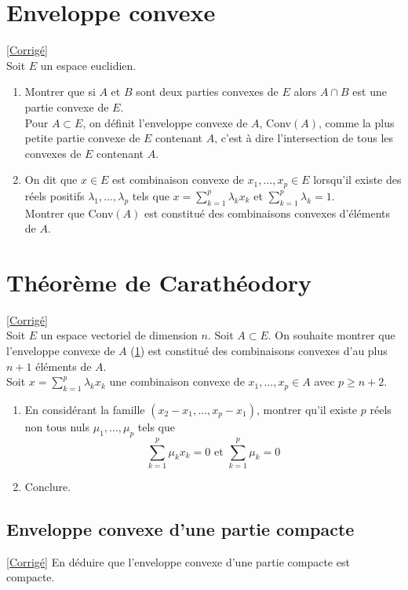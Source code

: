 \documentclass{book}
\begin{document}
\section{Enveloppe convexe}
\label{Enveloppe convexe}
\textcolor{blue}{\hyperref[sec:enveloppe-convexe]{[Corrigé]}}\\
Soit $E$ un espace euclidien.
\begin{enumerate}[leftmargin=*]
	\item Montrer que si $A$ et $B$ sont deux parties convexes de $E$ alors $A\cap B$ est une partie convexe de $E$.\\
	Pour $A\subset E$, on définit l'enveloppe convexe de $A$, Conv$(A)$, comme la plus petite partie convexe de $E$ contenant $A$, c'est à dire l'intersection de tous les convexes de $E$ contenant $A$.
	\item On dit que $x\in E$ est combinaison convexe de $x_1,\dots,x_p\in E$ lorsqu'il existe des réels positifs $\lambda_1,\dots,\lambda_p$ tels que $x=\displaystyle\sum\limits_{k=1}^p{\lambda_kx_k}$ et $\displaystyle\sum\limits_{k=1}^p{\lambda_k}=1$.\\
	Montrer que Conv$(A)$ est constitué des combinaisons convexes d'éléments de $A$.
\end{enumerate}

\section{Théorème de Carathéodory }
\label{Théorème de Carathéodory}
\textcolor{blue}{\hyperref[sec:theoreme-de-caratheodory]{[Corrigé]}}\\
Soit $E$ un espace vectoriel de dimension $n$. Soit $A\subset E$. On souhaite montrer que l'enveloppe convexe de $A$ (\ref{Enveloppe convexe}) est constitué des combinaisons convexes d'au plus $n+1$ éléments de $A$.\\
Soit $x=\displaystyle\sum\limits_{k=1}^p{\lambda_kx_k}$ une combinaison convexe de $x_1,\dots,x_p\in A$ avec $p\geq n+2$.
\begin{enumerate}
	\item En considérant la famille $(x_2-x_1,\dots,x_p-x_1)$, montrer qu'il existe $p$ réels non tous nuls $\mu_1,\dots,\mu_p$ tels que
	$$\displaystyle\sum\limits_{k=1}^p{\mu_kx_k}=0\text{   et   }\displaystyle\sum\limits_{k=1}^p{\mu_k}=0$$
	\item Conclure.
\end{enumerate}

\subsection{Enveloppe convexe d'une partie compacte }
\label{Enveloppe convexe d'une partie compacte}
\textcolor{blue}{\hyperref[sec-enveloppe-convexe-d'une-partie-compacte]{[Corrigé]}}
En déduire que l'enveloppe convexe d'une partie compacte est compacte.
\end{document}
